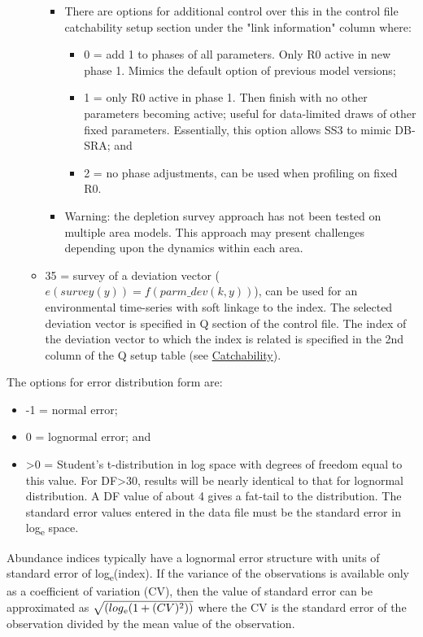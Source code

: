\begin{itemize}
\begin{itemize}
\begin{itemize}
				\item There are options for additional control over this in the control file catchability setup section under the "link information" column where:
				\begin{itemize}
				    \item 0 = add 1 to phases of all parameters. Only R0 active in new phase 1. Mimics the default option of previous model versions;
				    \item 1 = only R0 active in phase 1. Then finish with no other parameters becoming active; useful for data-limited draws of other fixed parameters.  Essentially, this option allows SS3 to mimic DB-SRA; and
				    \item 2 = no phase adjustments, can be used when profiling on fixed R0.
				\end{itemize}
				\item Warning: the depletion survey approach has not been tested on multiple area models.  This approach may present challenges depending upon the dynamics within each area.
			\end{itemize}
			\item 35 = survey of a deviation vector ($e(survey(y)) = f(parm\_dev(k,y))$), can be used for an environmental time-series with soft linkage to the index. The selected deviation vector is specified in Q section of the control file. The index of the deviation vector to which the index is related is specified in the 2nd column of the Q setup table (see \hyperlink{Qsetup}{Catchability}).
		\end{itemize}
	\end{itemize}

The options for error distribution form are:
	\begin{itemize}
		\item -1 = normal error;
		\item  0 = lognormal error; and 
		\item >0 = Student's t-distribution in log space with degrees of freedom equal to this value.  For DF>30, results will be nearly identical to that for lognormal distribution.  A DF value of about 4 gives a fat-tail to the distribution.  The standard error values entered in the data file must be the standard error in log\textsubscript{e} space.
	\end{itemize}

Abundance indices typically have a lognormal error structure with units of standard error of log\textsubscript{e}(index).  If the variance of the observations is available only as a coefficient of variation (CV), then the value of standard error can be approximated as $\sqrt{(log\textsubscript{e}(1+(CV)\textsuperscript{2}))}$ where the CV is the standard error of the observation divided by the mean value of the observation.


